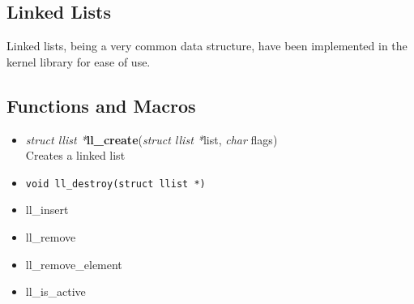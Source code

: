 \documentclass[a4paper]{article}
\begin{document}
\begin{noindent}

\section{Linked Lists}

Linked lists, being a very common data structure, have been implemented
in the kernel library for ease of use. 

\subsection{Functions and Macros}

\begin{itemize}
\item \textit{struct llist *}\textbf{ll\_create}(\textit{struct llist *}list, \textit{char} flags) \\
Creates a linked list
\item \lstinline!void ll_destroy(struct llist *)!
\item ll\_insert
\item ll\_remove
\item ll\_remove\_element
\item ll\_is\_active
\end{itemize}



\end{noindent}
\end{document}
